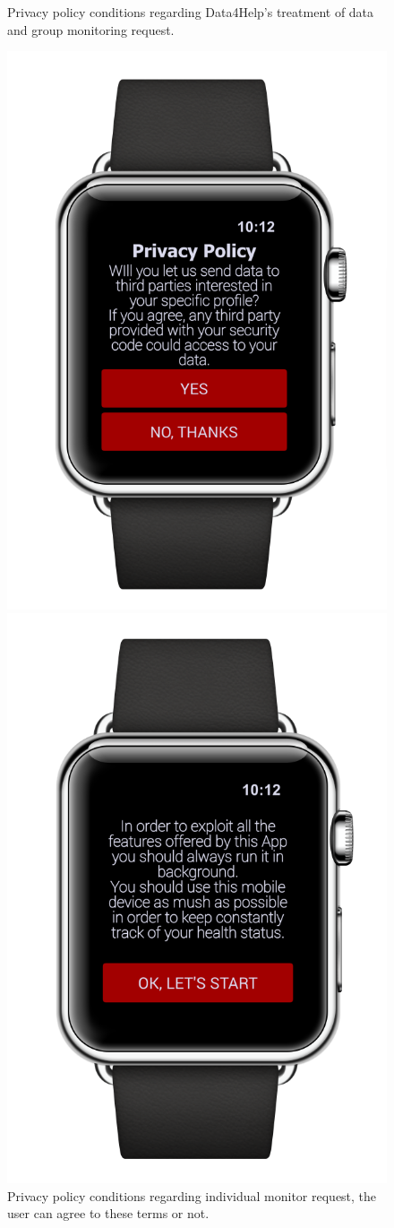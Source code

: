 \begin{enumerate}
\begin{figure}[H]
\begin{center}
\begin{minipage}[c]{.40\textwidth}
	\caption{Privacy policy conditions regarding Data4Help's treatment of data and group monitoring request.}
        \end{minipage}
      \end{center}
\end{figure}
\begin{figure}[H]
\begin{center}
        \begin{minipage}[c]{.40\textwidth}
	\centering
          \includegraphics[height=9.5  cm]{Images/Mockups/AutomatedSOSMockup3.png}
	\caption{Privacy policy conditions regarding individual monitor request, the user can agree to these terms or not. }
        \end{minipage}%
        \hspace{10mm}%
        \begin{minipage}[c]{.40\textwidth}
	\centering
          \includegraphics[height=9.5  cm]{Images/Mockups/AutomatedSOSMockup4.png}

\end{minipage}
\end{center}
\end{figure}
\end{enumerate}

